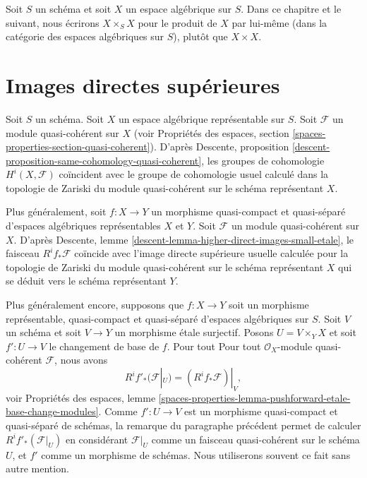 \medskip\noindent
Soit $S$ un schéma et soit $X$ un espace algébrique sur $S$.
Dans ce chapitre et le suivant, nous écrirons $X \times_S X$
pour le produit de $X$ par lui-même (dans la catégorie des espaces algébriques
sur $S$), plutôt que $X \times X$.








\section{Images directes supérieures}
\label{section-higher-direct-image}

\noindent
Soit $S$ un schéma. Soit $X$ un espace algébrique représentable sur $S$.
Soit $\mathcal{F}$ un module quasi-cohérent sur $X$ (voir
Propriétés des espaces, section \ref{spaces-properties-section-quasi-coherent}).
D'après
Descente, proposition \ref{descent-proposition-same-cohomology-quasi-coherent},
les groupes de cohomologie $H^i(X, \mathcal{F})$ coïncident avec le groupe de
cohomologie usuel calculé dans la topologie de Zariski du
module quasi-cohérent sur le schéma représentant $X$.

\medskip\noindent
Plus généralement, soit $f : X \to Y$ un morphisme quasi-compact et quasi-séparé
d'espaces algébriques représentables $X$ et $Y$. Soit
$\mathcal{F}$ un module quasi-cohérent sur $X$. D'après
Descente, lemme \ref{descent-lemma-higher-direct-images-small-etale},
le faisceau $R^if_*\mathcal{F}$ coïncide avec l'image
directe supérieure usuelle calculée pour la topologie de Zariski
du module quasi-cohérent sur le schéma représentant $X$
qui se déduit vers le schéma représentant $Y$.

\medskip\noindent
Plus généralement encore, supposons que $f : X \to Y$ soit un
morphisme représentable, quasi-compact et
quasi-séparé d'espaces algébriques sur $S$. Soit $V$ un schéma
et soit $V \to Y$ un morphisme étale surjectif. Posons $U = V \times_Y X$
et soit $f' : U \to V$ le changement de base de $f$. Pour tout
Pour tout $\mathcal{O}_X$-module quasi-cohérent $\mathcal{F}$, nous avons
\begin{equation}
\label{equation-representable-higher-direct-image}
R^if'_*(\mathcal{F}|_U) = (R^if_*\mathcal{F})|_V,
\end{equation}
voir
Propriétés des espaces,
lemme \ref{spaces-properties-lemma-pushforward-etale-base-change-modules}.
Comme $f' : U \to V$ est un morphisme quasi-compact et quasi-séparé
de schémas, la remarque du paragraphe précédent permet de
calculer $R^if'_*(\mathcal{F}|_U)$ en considérant $\mathcal{F}|_U$ comme un
faisceau quasi-cohérent sur le schéma $U$, et $f'$ comme un morphisme de schémas.
Nous utiliserons souvent ce fait sans autre mention.

